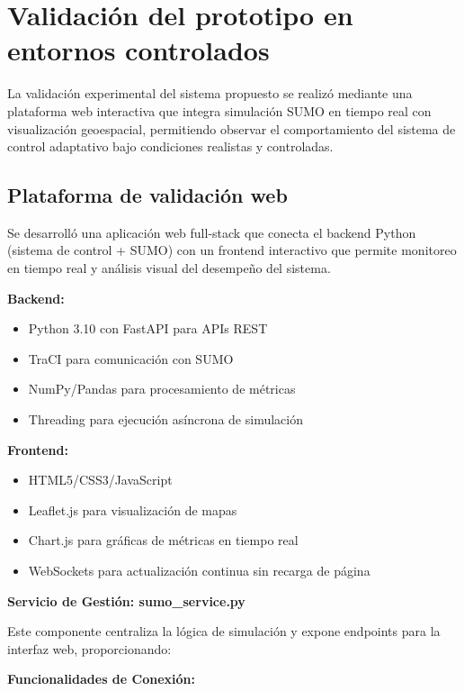 \documentclass[12pt,a4paper,oneside]{report}
\begin{document}
\section{Validación del prototipo en entornos controlados}\label{validaciuxf3n-del-prototipo-en-entornos-controlados}

La validación experimental del sistema propuesto se realizó mediante una plataforma web interactiva que integra simulación SUMO en tiempo real con visualización geoespacial, permitiendo observar el comportamiento del sistema de control adaptativo bajo condiciones realistas y controladas.

\subsection{Plataforma de validación web}\label{plataforma-de-validaciuxf3n-web}

Se desarrolló una aplicación web full-stack que conecta el backend Python (sistema de control + SUMO) con un frontend interactivo que permite monitoreo en tiempo real y análisis visual del desempeño del sistema.

\textbf{Backend:}

\begin{itemize}
\item
  Python 3.10 con FastAPI para APIs REST
\item
  TraCI para comunicación con SUMO
\item
  NumPy/Pandas para procesamiento de métricas
\item
  Threading para ejecución asíncrona de simulación
\end{itemize}

\textbf{Frontend:}

\begin{itemize}
\item
  HTML5/CSS3/JavaScript
\item
  Leaflet.js para visualización de mapas
\item
  Chart.js para gráficas de métricas en tiempo real
\item
  WebSockets para actualización continua sin recarga de página
\end{itemize}

\textbf{Servicio de Gestión: sumo\_service.py}

Este componente centraliza la lógica de simulación y expone endpoints para la interfaz web, proporcionando:

\textbf{Funcionalidades de Conexión:}
\end{document}
